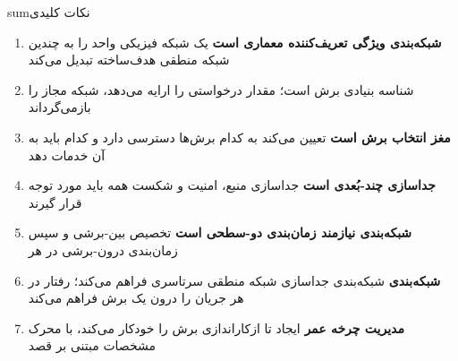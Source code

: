\begin{CNbox}[unbreakable]{sum}{نکات کلیدی}

\begin{enumerate}
\def\labelenumi{\arabic{enumi}.}
\tightlist
\item
  \textbf{شبکه‌بندی ویژگی تعریف‌کننده معماری  است}  یک شبکه فیزیکی واحد را به چندین شبکه منطقی هدف‌ساخته تبدیل می‌کند
\item
   شناسه بنیادی برش است؛  مقدار  درخواستی را ارایه می‌دهد، شبکه  مجاز را بازمی‌گرداند
\item
  \textbf{ مغز انتخاب برش است}  تعیین می‌کند  به کدام برش‌ها دسترسی دارد و کدام  باید به آن خدمات دهد
\item
  \textbf{جداسازی چند-بُعدی است}  جداسازی منبع، امنیت و شکست همه باید مورد توجه قرار گیرند
\item
  \textbf{شبکه‌بندی  نیازمند زمان‌بندی دو-سطحی است}  تخصیص بین-برشی و سپس زمان‌بندی درون-برشی در هر 
\item
  \textbf{شبکه‌بندی }  شبکه‌بندی جداسازی شبکه منطقی سرتاسری فراهم می‌کند؛  رفتار در هر جریان را درون یک برش فراهم می‌کند
\item
  \textbf{مدیریت چرخه عمر} ایجاد تا ازکاراندازی برش را خودکار می‌کند، با محرک مشخصات مبتنی بر قصد
\end{enumerate}

\end{CNbox}
